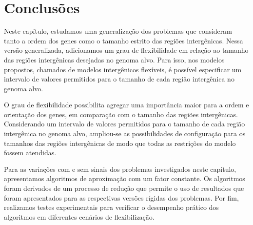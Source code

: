 \section{Conclusões}

Neste capítulo, estudamos uma generalização dos problemas que consideram tanto a ordem dos genes como o tamanho estrito das regiões intergênicas. Nessa versão generalizada, adicionamos um grau de flexibilidade em relação ao tamanho das regiões intergênicas desejadas no genoma alvo. Para isso, nos modelos propostos, chamados de modelos intergênicos flexíveis, é possível especificar um intervalo de valores permitidos para o tamanho de cada região intergênica no genoma alvo. 

O grau de flexibilidade possibilita agregar uma importância maior para a ordem e orientação dos genes, em comparação com o tamanho das regiões intergênicas. Considerando um intervalo de valores permitidos para o tamanho de cada região intergênica no genoma alvo, ampliou-se as possibilidades de configuração para os tamanhos das regiões intergênicas de modo que todas as restrições do modelo fossem atendidas.

Para as variações com e sem sinais dos problemas investigados neste capítulo, apresentamos algoritmos de aproximação com um fator constante. Os algoritmos foram derivados de um processo de redução que permite o uso de resultados que foram apresentados para as respectivas versões rígidas dos problemas. Por fim, realizamos testes experimentais para verificar o desempenho prático dos algoritmos em diferentes cenários de flexibilização.
